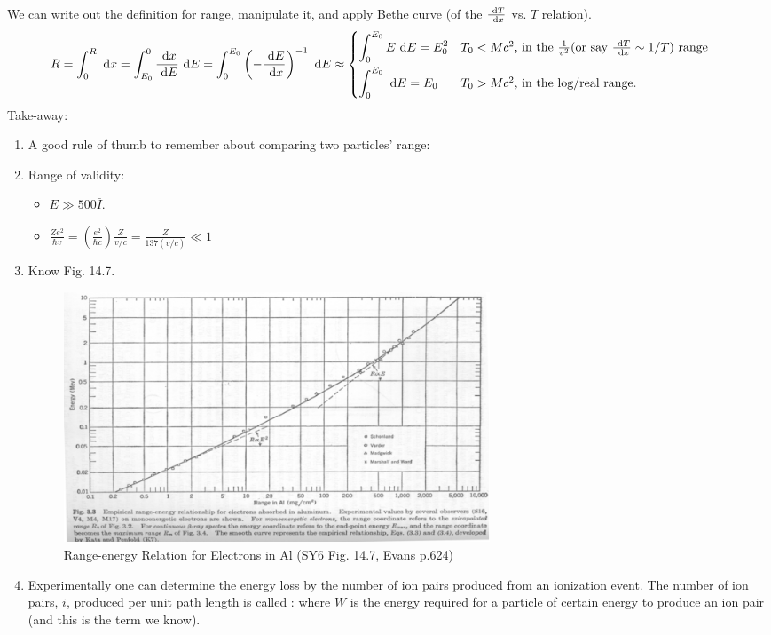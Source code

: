 \documentclass{school-22.101-notes}
\begin{document}
We can write out the definition for range, manipulate it, and apply Bethe curve (of the $\frac{\mbox{ }\mathrm{d} T}{\mbox{ }\mathrm{d} x}$ vs. $T$ relation). 
\begin{align}
    R &= \int_0^R \dx = \int_{E_0}^0 \frac{\dx}{\dE} \dE = \int_0^{E_0} \left( - \frac{\dE}{\dx} \right)^{-1} \dE  \approx \begin{dcases*}
 \int_0^{E_0} E \dE = E_0^2 & $T_0 < Mc^2$, in the $\frac{1}{v^2}$(or say $\frac{\dT}{\dx} \sim 1/T$) range \\ 
\int_0^{E_0} \dE  = E_0 & $T_0 > Mc^2$, in the log/real range. 
\end{dcases*}
\end{align}
Take-away:
\begin{enumerate}
\item A good rule of thumb to remember about comparing two particles' range:

\item Range of validity:
\begin{itemize}
    \item $E \gg 500 \bar{I}$. 
    \item $\frac{Z e^2}{\hbar v} = \left( \frac{e^2}{\hbar c} \right) \frac{Z}{v/c} = \frac{Z}{137 (v/c) } \ll 1 $
\end{itemize}

\item Know Fig. 14.7.
\begin{figure}[ht]
  \centering
  \includegraphics[width=5in]{images/ni/14.7.png}
  \caption{Range-energy Relation for Electrons in Al (SY6 Fig. 14.7, Evans p.624)} \label{14.7}
\end{figure}


\item Experimentally one can determine the energy loss by the number of ion pairs produced from an ionization event. The number of ion pairs, $i$, produced per unit path length is called : 
where $W$ is the energy required for a particle of certain energy to produce an ion pair (and this is the term we know). 


\end{enumerate}
\end{document}
